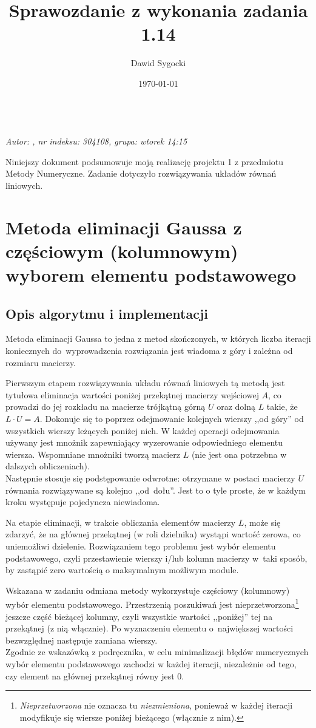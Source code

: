 \documentclass[12pt]{article}
\title{Sprawozdanie z wykonania zadania 1.14}
\author{Dawid Sygocki}
\date{\today}
\begin{document}
\makeatletter
{\huge \@title} \\
\textsl{\large Autor: \@author, nr indeksu: 304108, grupa: wtorek 14:15}
\makeatother

Niniejszy dokument podsumowuje moją realizację projektu 1 z przedmiotu Metody Numeryczne. Zadanie dotyczyło rozwiązywania układów równań liniowych.

\section{Metoda eliminacji Gaussa z częściowym (kolumnowym) wyborem elementu podstawowego}

\subsection{Opis algorytmu i implementacji}
Metoda eliminacji Gaussa to jedna z metod skończonych, w których liczba iteracji koniecznych do~wyprowadzenia rozwiązania jest wiadoma z góry i zależna od rozmiaru macierzy.

Pierwszym etapem rozwiązywania układu równań liniowych tą metodą jest tytułowa eliminacja wartości poniżej przekątnej macierzy wejściowej \(A\), co prowadzi do jej rozkładu na macierze trójkątną górną \(U\) oraz dolną \(L\) takie, że \(L\cdot U = A\). Dokonuje się to poprzez odejmowanie kolejnych wierszy ,,od góry'' od wszystkich wierszy leżących poniżej nich. W każdej operacji odejmowania używany jest mnożnik zapewniający wyzerowanie odpowiedniego elementu wiersza. Wspomniane mnożniki tworzą macierz \(L\) (nie jest ona potrzebna w dalszych obliczeniach). \\
Następnie stosuje się podstępowanie odwrotne: otrzymane w postaci macierzy \(U\) równania rozwiązywane są kolejno ,,od~dołu''. Jest to o tyle proste, że w każdym kroku występuje pojedyncza niewiadoma.

Na etapie eliminacji, w trakcie obliczania elementów macierzy \(L\), może się zdarzyć, że na głównej przekątnej (w roli dzielnika) wystąpi wartość zerowa, co uniemożliwi dzielenie. Rozwiązaniem tego problemu jest wybór elementu podstawowego, czyli przestawienie wierszy i/lub kolumn macierzy w~taki sposób, by zastąpić zero wartością o maksymalnym możliwym module.

Wskazana w zadaniu odmiana metody wykorzystuje częściowy (kolumnowy) wybór elementu podstawowego. Przestrzenią poszukiwań jest nieprzetworzona\footnote{\emph{Nieprzetworzona} nie oznacza tu \emph{niezmieniona}, ponieważ w każdej iteracji modyfikuje się wiersze poniżej bieżącego (włącznie z nim).} jeszcze część bieżącej kolumny, czyli wszystkie wartości ,,poniżej'' tej na przekątnej (z nią włącznie). Po wyznaczeniu elementu o~największej wartości bezwzględnej następuje zamiana wierszy. \\
Zgodnie ze wskazówką z podręcznika, w celu minimalizacji błędów numerycznych wybór elementu podstawowego zachodzi w każdej iteracji, niezależnie od tego, czy element na głównej przekątnej równy jest 0.
\end{document}
